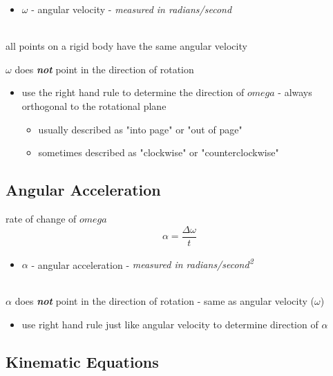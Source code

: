 \documentclass[titlepage]{article}
\begin{document}
\begin{itemize}
    \item $\omega$ - angular velocity - \emph{measured in radians/second}
\end{itemize}
\ \\
all points on a rigid body have the same angular velocity

$\omega$ does \textbf{\emph{not}} point in the direction of rotation
\begin{itemize}
    \item use the right hand rule to determine the direction of $omega$ - always orthogonal to the rotational plane
          \begin{itemize}
              \item usually described as "into page" or "out of page"
              \item sometimes described as "clockwise" or "counterclockwise"
          \end{itemize}
\end{itemize}

\subsection{Angular Acceleration}
rate of change of $omega$
\[ \alpha = \frac{\Delta \omega}{t} \]
\begin{itemize}
    \item $\alpha$ - angular acceleration - \emph{measured in radians/second\textsuperscript{2}}
\end{itemize}
\ \\
$\alpha$ does \textbf{\emph{not}} point in the direction of rotation - same as angular velocity ($\omega$)
\begin{itemize}
    \item use right hand rule just like angular velocity to determine direction of $\alpha$
\end{itemize}

\subsection{Kinematic Equations}
\end{document}
